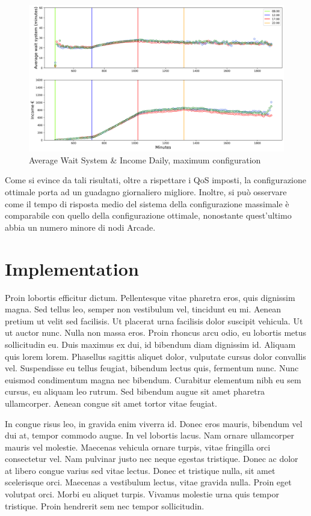 \documentclass{article}
\begin{document}
\begin{figure}[H]
	\centering
	\captionsetup{justification=centering,margin=2cm}
	\includegraphics[scale=0.48]{images/ts_max.png}
	\caption{Average Wait System \& Income Daily, maximum configuration}\label{figura:ts_max}
\end{figure}
Come si evince da tali risultati, oltre a rispettare i QoS imposti, la configurazione ottimale porta ad un guadagno giornaliero migliore. Inoltre, si può osservare come il tempo di risposta medio del sistema della configurazione massimale è comparabile con quello della configurazione ottimale, nonostante quest'ultimo abbia un numero minore di nodi Arcade.

\section{Implementation}

Proin lobortis efficitur dictum. Pellentesque vitae pharetra eros, quis dignissim magna. Sed tellus leo, semper non vestibulum vel, tincidunt eu mi. Aenean pretium ut velit sed facilisis. Ut placerat urna facilisis dolor suscipit vehicula. Ut ut auctor nunc. Nulla non massa eros. Proin rhoncus arcu odio, eu lobortis metus sollicitudin eu. Duis maximus ex dui, id bibendum diam dignissim id. Aliquam quis lorem lorem. Phasellus sagittis aliquet dolor, vulputate cursus dolor convallis vel. Suspendisse eu tellus feugiat, bibendum lectus quis, fermentum nunc. Nunc euismod condimentum magna nec bibendum. Curabitur elementum nibh eu sem cursus, eu aliquam leo rutrum. Sed bibendum augue sit amet pharetra ullamcorper. Aenean congue sit amet tortor vitae feugiat.

In congue risus leo, in gravida enim viverra id. Donec eros mauris, bibendum vel dui at, tempor commodo augue. In vel lobortis lacus. Nam ornare ullamcorper mauris vel molestie. Maecenas vehicula ornare turpis, vitae fringilla orci consectetur vel. Nam pulvinar justo nec neque egestas tristique. Donec ac dolor at libero congue varius sed vitae lectus. Donec et tristique nulla, sit amet scelerisque orci. Maecenas a vestibulum lectus, vitae gravida nulla. Proin eget volutpat orci. Morbi eu aliquet turpis. Vivamus molestie urna quis tempor tristique. Proin hendrerit sem nec tempor sollicitudin.
\end{document}
